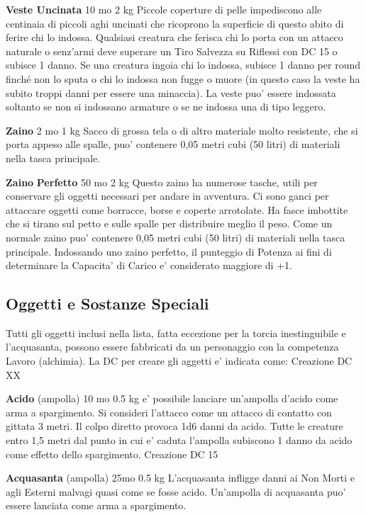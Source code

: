 \documentclass[a4paper,11pt,twoside,openany]{book}
\begin{document}
{\textbf{Veste Uncinata} 10 mo 2 kg Piccole coperture di pelle impediscono alle centinaia di piccoli aghi uncinati che ricoprono la superficie di questo abito di ferire chi lo indossa. Qualsiasi creatura che ferisca chi lo porta con un attacco naturale o senz'armi deve superare un Tiro Salvezza su Riflessi con DC 15 o subisce 1 danno. Se una creatura ingoia chi lo indossa, subisce 1 danno per round finché non lo sputa o chi lo indossa non fugge o muore (in questo caso la veste ha subito troppi danni per essere una minaccia). La veste puo' essere indossata soltanto se non si indossano armature o se ne indossa una di tipo leggero.

\textbf{Zaino} 2 mo 1 kg Sacco di grossa tela o di altro materiale molto resistente, che si porta appeso alle spalle, puo' contenere 0,05 metri cubi (50 litri) di materiali nella tasca principale. 

\textbf{Zaino} \textbf{Perfetto} 50 mo 2 kg Questo zaino ha numerose tasche, utili per conservare gli oggetti necessari per andare in avventura. Ci sono ganci per attaccare oggetti come borracce, borse e coperte arrotolate. Ha fasce imbottite che si tirano sul petto e sulle spalle per distribuire meglio il peso. Come un normale zaino puo' contenere 0,05 metri cubi (50 litri) di materiali nella tasca principale. Indossando uno zaino perfetto, il punteggio di Potenza ai fini di determinare la Capacita' di Carico e' considerato maggiore di +1.

\subsection{Oggetti e Sostanze Speciali}

\label{oggetti-e-sostanze-speciali}

Tutti gli oggetti inclusi nella lista, fatta eccezione per la torcia inestinguibile e l'acquasanta, possono essere fabbricati da un personaggio con la competenza Lavoro (alchimia). La DC per creare gli aggetti e' indicata come: Creazione DC XX

\textbf{Acido} (ampolla) 10 mo 0.5 kg e' possibile lanciare un'ampolla d'acido come arma a spargimento. Si consideri l'attacco come un attacco di contatto con gittata 3 metri. Il colpo diretto provoca 1d6 danni da acido. Tutte le creature entro 1,5 metri dal punto in cui e' caduta l'ampolla subiscono 1 danno da acido come effetto dello spargimento.
Creazione DC 15

\textbf{Acquasanta} (ampolla) 25mo 0.5 kg L'acquasanta infligge danni ai Non Morti e agli Esterni malvagi quasi come se fosse acido. Un'ampolla di acquasanta puo' essere lanciata come arma a spargimento.

}
\end{document}
